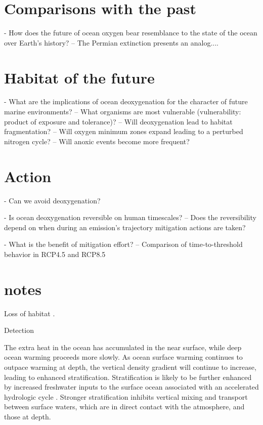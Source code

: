 \documentclass[draft,linenumbers]{report_chapter}
\begin{document}
\section{Comparisons with the past}
- How does the future of ocean oxygen bear resemblance to the state of the ocean over Earth's history?
	-- The Permian extinction presents an analog....

\section{Habitat of the future}
- What are the implications of ocean deoxygenation for the character of future marine environments?
	-- What organisms are most vulnerable (vulnerability: product of exposure and tolerance)?
	-- Will deoxygenation lead to habitat fragmentation?
	-- Will oxygen minimum zones expand leading to a perturbed nitrogen cycle?
	-- Will anoxic events become more frequent?

\section{Action}
- Can we avoid deoxygenation?

- Is ocean deoxygenation reversible on human timescales?
	-- Does the reversibility depend on when during an emission's trajectory mitigation actions are taken?

- What is the benefit of mitigation effort?
	-- Comparison of time-to-threshold behavior in RCP4.5 and RCP8.5


	\section*{notes}


	Loss of habitat \citep{Keeling-Kortzinger-etal-2010}.

	Detection \citep{Long-Deutsch-etal-2016}


	The extra heat in the ocean has accumulated in the near surface, while deep ocean warming proceeds more slowly.
	As ocean surface warming continues to outpace warming at depth, the vertical density gradient will continue to increase, leading to enhanced stratification.
	Stratification is likely to be further enhanced by increased freshwater inputs to the surface ocean associated with an accelerated hydrologic cycle \citep{ref}.
	Stronger stratification inhibits vertical mixing and transport between surface waters, which are in direct contact with the atmosphere, and those at depth.
\end{document}
